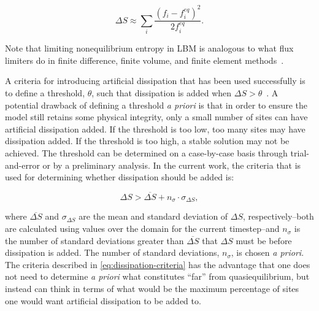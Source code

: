 \documentclass[pdftex,ms]{pittetd}
\begin{document}
\begin{equation} \label{eq:quadratic-entropy}
\Delta S \approx \sum_i \frac{(f_i - f^{eq}_i)^2}{2f^{eq}_i}.
\end{equation}

\noindent Note that limiting nonequilibrium entropy in LBM is analogous to what flux limiters do in finite difference, finite volume, and finite element methods~\cite{brownlee2008nonequilibrium}.

A criteria for introducing artificial dissipation that has been used successfully is to define a threshold, $\theta$, such that dissipation is added when $\Delta S > \theta$~\cite{gorban2014enhancement,brownlee2006stabilization,brownlee2007stability,brownlee2008nonequilibrium}.
A potential drawback of defining a threshold \textit{a priori} is that in order to ensure the model still retains some physical integrity, only a small number of sites can have artificial dissipation added.
If the threshold is too low, too many sites may have dissipation added.
If the threshold is too high, a stable solution may not be achieved.
The threshold can be determined on a case-by-case basis through trial-and-error or by a preliminary analysis.
In the current work, the criteria that is used for determining whether dissipation should be added is:

\begin{equation} \label{eq:dissipation-criteria}
    \Delta S > \overline{\Delta S} + n_\sigma \cdot \sigma_{\Delta S},
\end{equation}

\noindent where $\overline{\Delta S}$ and $\sigma_{\Delta S}$ are the mean and standard deviation of $\Delta S$, respectively--both are calculated using values over the domain for the current timestep--and $n_\sigma$ is the number of standard deviations greater than $\overline{\Delta S}$ that $\Delta S$ must be before dissipation is added.
The number of standard deviations, $n_\sigma$, is chosen \textit{a priori}.
The criteria described in \eqref{eq:dissipation-criteria} has the advantage that one does not need to determine \textit{a priori} what constitutes ``far'' from quasiequilibrium, but instead can think in terms of what would be the maximum percentage of sites one would want artificial dissipation to be added to.
\end{document}

